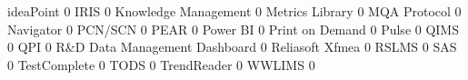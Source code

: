\documentclass{article}
\begin{document}
\begin{Schunk}
\begin{Soutput}
  ideaPoint                                                                                0
  IRIS                                                                                     0
  Knowledge Management                                                                     0
  Metrics Library                                                                          0
  MQA Protocol                                                                             0
  Navigator                                                                                0
  PCN/SCN                                                                                  0
  PEAR                                                                                     0
  Power BI                                                                                 0
  Print on Demand                                                                          0
  Pulse                                                                                    0
  QIMS                                                                                     0
  QPI                                                                                      0
  R&D Data Management Dashboard                                                            0
  Reliasoft Xfmea                                                                          0
  RSLMS                                                                                    0
  SAS                                                                                      0
  TestComplete                                                                             0
  TODS                                                                                     0
  TrendReader                                                                              0
  WWLIMS                                                                                   0
                                                           

\end{Soutput}
\end{Schunk}
\end{document}
